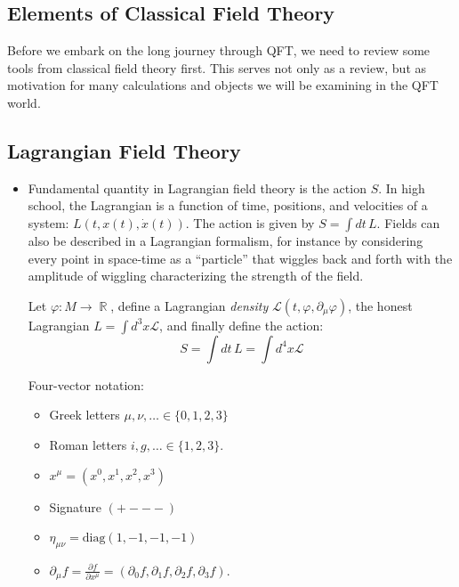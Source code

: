 \documentclass{report}
\theoremstyle{plain}
\theoremstyle{definition}
\theoremstyle{remark}
\newcommand{\FR}[2]{\frac{#1}{#2}}
\newcommand{\mc}{\mathcal}
\newcommand{\vphi}{\varphi}
\newcommand{\di}{\partial}
\DeclareMathOperator{\bR}{\mathbb{R}}
\begin{document}
\subsection{Elements of Classical Field Theory}

Before we embark on the long journey through QFT, we need to review
some tools from classical field theory first. This serves not only as
a review, but as motivation for many calculations and objects we will
be examining in the QFT world.

\subsection{Lagrangian Field Theory}

\begin{itemize}
\item Fundamental quantity in Lagrangian field theory is the action $S$.
In high school, the Lagrangian is a function of time,
positions, and velocities of a system: $L(t,x(t),\dot x(t))$. The action
is given by $S = \int dt\, L$.
Fields can also be described in a Lagrangian formalism, for instance by
considering every point in space-time as a ``particle'' that wiggles back
and forth with the amplitude of wiggling characterizing the strength of the
field.

Let $\vphi : M \to \bR$, define a Lagrangian \emph{density} $\mc
L(t,\vphi,\di_\mu \vphi)$, the honest Lagrangian $L = \int d^3x \mc L$, and
finally define the action: \[ S = \int dt\, L = \int d^4x \mc L \]

\begin{mdframed}
    Four-vector notation:
    \begin{itemize}
        \item Greek letters $\mu,\nu,\ldots \in \{0,1,2,3\}$
        \item Roman letters $i,g,\ldots \in \{1,2,3\}$.
        \item $x^\mu = (x^0,x^1,x^2,x^3)$
        \item Signature $(+---)$
        \item $\eta_{\mu\nu} = \mathrm{diag}(1,-1,-1,-1)$
        \item $\di_\mu f = \FR{\di f}{\di x^\mu} = (\di_0 f,\di_1 f,\di_2
            f,\di_3 f)$.
    \end{itemize}
\end{mdframed}


\end{itemize}
\end{document}
